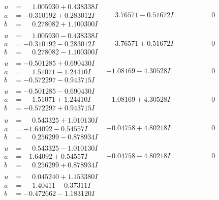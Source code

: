 \documentclass[1p]{elsarticle_modified}
\theoremstyle{definition}
\begin{document}
$$\begin{array}{c|c|c}
\begin{aligned}
u &= \phantom{-}1.005930 + 0.438338 I \\
a &= -0.310192 + 0.283012 I \\
b &= \phantom{-}0.278082 + 1.100300 I\end{aligned}
 & \phantom{-}3.76571 - 0.51672 I & \phantom{-0.000000 } 0 \\ \hline\begin{aligned}
u &= \phantom{-}1.005930 - 0.438338 I \\
a &= -0.310192 - 0.283012 I \\
b &= \phantom{-}0.278082 - 1.100300 I\end{aligned}
 & \phantom{-}3.76571 + 0.51672 I & \phantom{-0.000000 } 0 \\ \hline\begin{aligned}
u &= -0.501285 + 0.690430 I \\
a &= \phantom{-}1.51071 - 1.24410 I \\
b &= -0.572297 - 0.943715 I\end{aligned}
 & -1.08169 - 4.30528 I & \phantom{-0.000000 } 0 \\ \hline\begin{aligned}
u &= -0.501285 - 0.690430 I \\
a &= \phantom{-}1.51071 + 1.24410 I \\
b &= -0.572297 + 0.943715 I\end{aligned}
 & -1.08169 + 4.30528 I & \phantom{-0.000000 } 0 \\ \hline\begin{aligned}
u &= \phantom{-}0.543325 + 1.010130 I \\
a &= -1.64092 - 0.54557 I \\
b &= \phantom{-}0.256299 - 0.878934 I\end{aligned}
 & -0.04758 + 4.80218 I & \phantom{-0.000000 } 0 \\ \hline\begin{aligned}
u &= \phantom{-}0.543325 - 1.010130 I \\
a &= -1.64092 + 0.54557 I \\
b &= \phantom{-}0.256299 + 0.878934 I\end{aligned}
 & -0.04758 - 4.80218 I & \phantom{-0.000000 } 0 \\ \hline\begin{aligned}
u &= \phantom{-}0.045240 + 1.153380 I \\
a &= \phantom{-}1.40411 - 0.37311 I \\
b &= -0.472662 - 1.183120 I\end{aligned}

\end{array}$$
\end{document}
